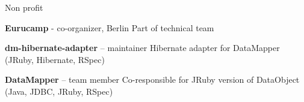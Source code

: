 \begin{rubric}{Non profit}


\entry*[2012--2013]
  \textbf{Eurucamp} - co-organizer, Berlin
\entry*
  Part of technical team

  
  
\entry*[01.2010--\ldots]
  \textbf{dm-hibernate-adapter} -- maintainer
\entry*
  Hibernate adapter for DataMapper (JRuby, Hibernate, RSpec)

\entry*[01.2009--12.2009]
  \textbf{DataMapper}  -- team member
\entry*
  Co-responsible for JRuby version of DataObject (Java, JDBC, JRuby, RSpec)
  
\end{rubric}